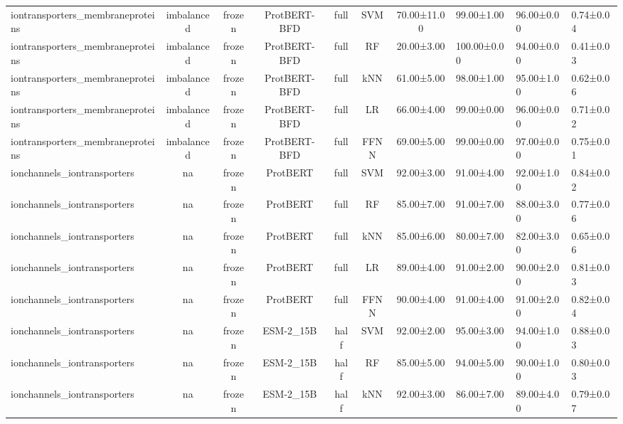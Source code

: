 \begin{tabular}{lcccccc}
iontransporters\_membraneproteins & imbalanced &         frozen & ProtBERT-BFD &      full &        SVM & 70.00±11.00 &  99.00±1.00 &  96.00±0.00 & 0.74±0.04 \\
iontransporters\_membraneproteins & imbalanced &         frozen & ProtBERT-BFD &      full &         RF &  20.00±3.00 & 100.00±0.00 &  94.00±0.00 & 0.41±0.03 \\
iontransporters\_membraneproteins & imbalanced &         frozen & ProtBERT-BFD &      full &        kNN &  61.00±5.00 &  98.00±1.00 &  95.00±1.00 & 0.62±0.06 \\
iontransporters\_membraneproteins & imbalanced &         frozen & ProtBERT-BFD &      full &         LR &  66.00±4.00 &  99.00±0.00 &  96.00±0.00 & 0.71±0.02 \\
iontransporters\_membraneproteins & imbalanced &         frozen & ProtBERT-BFD &      full &       FFNN &  69.00±5.00 &  99.00±0.00 &  97.00±0.00 & 0.75±0.01 \\
     ionchannels\_iontransporters &         na &         frozen &     ProtBERT &      full &        SVM &  92.00±3.00 &  91.00±4.00 &  92.00±1.00 & 0.84±0.02 \\
     ionchannels\_iontransporters &         na &         frozen &     ProtBERT &      full &         RF &  85.00±7.00 &  91.00±7.00 &  88.00±3.00 & 0.77±0.06 \\
     ionchannels\_iontransporters &         na &         frozen &     ProtBERT &      full &        kNN &  85.00±6.00 &  80.00±7.00 &  82.00±3.00 & 0.65±0.06 \\
     ionchannels\_iontransporters &         na &         frozen &     ProtBERT &      full &         LR &  89.00±4.00 &  91.00±2.00 &  90.00±2.00 & 0.81±0.03 \\
     ionchannels\_iontransporters &         na &         frozen &     ProtBERT &      full &       FFNN &  90.00±4.00 &  91.00±4.00 &  91.00±2.00 & 0.82±0.04 \\
     ionchannels\_iontransporters &         na &         frozen &    ESM-2\_15B &      half &        SVM &  92.00±2.00 &  95.00±3.00 &  94.00±1.00 & 0.88±0.03 \\
     ionchannels\_iontransporters &         na &         frozen &    ESM-2\_15B &      half &         RF &  85.00±5.00 &  94.00±5.00 &  90.00±1.00 & 0.80±0.03 \\
     ionchannels\_iontransporters &         na &         frozen &    ESM-2\_15B &      half &        kNN &  92.00±3.00 &  86.00±7.00 &  89.00±4.00 & 0.79±0.07 \\

\end{tabular}
